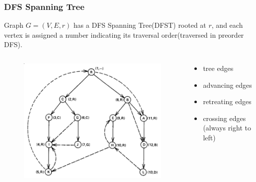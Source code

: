 \documentclass[]{beamer}
\begin{document}
\begin{frame}
  \frametitle{DFS Spanning Tree}
  Graph $G=(V, E, r)$ has a \alert{DFS Spanning Tree(DFST)}
  rooted at $r$, and each vertex is assigned a number indicating its
  traversal order(traversed in preorder DFS).

  \pause
  \begin{columns}
    \begin{column}{.65\textwidth}
      \begin{figure}
        \includegraphics[height=.55\textheight]{figures/dfst}
      \end{figure}
    \end{column}
    \begin{column}{.35\textwidth}
      \begin{itemize}
        \item tree edges%
        \item advancing edges%
        \item retreating edges%
        \item crossing edges (always \alert{right to left})%
      \end{itemize}
    \end{column}
  \end{columns}
\end{frame}
\end{document}
